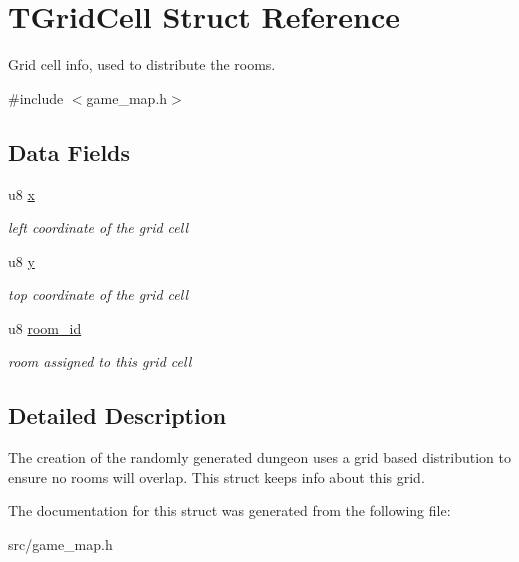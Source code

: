 \hypertarget{structTGridCell}{}\section{T\+Grid\+Cell Struct Reference}
\label{structTGridCell}


Grid cell info, used to distribute the rooms.  




{\ttfamily \#include $<$game\+\_\+map.\+h$>$}

\subsection*{Data Fields}
\begin{DoxyCompactItemize}
\item 
u8 \mbox{\hyperlink{group__GameMap_ga9eb413b36d66119ffbb32a5a23c5d628}{x}}
\begin{DoxyCompactList}\small\item\em left coordinate of the grid cell \end{DoxyCompactList}\item 
u8 \mbox{\hyperlink{group__GameMap_ga203679fb4506b253419a1eb4db418ae5}{y}}
\begin{DoxyCompactList}\small\item\em top coordinate of the grid cell \end{DoxyCompactList}\item 
u8 \mbox{\hyperlink{group__GameMap_gaf6810a8c1ba4361c7fda884f6cbb7787}{room\+\_\+id}}
\begin{DoxyCompactList}\small\item\em room assigned to this grid cell \end{DoxyCompactList}\end{DoxyCompactItemize}


\subsection{Detailed Description}
The creation of the randomly generated dungeon uses a grid based distribution to ensure no rooms will overlap. This struct keeps info about this grid. 

The documentation for this struct was generated from the following file\+:\begin{DoxyCompactItemize}
\item 
src/game\+\_\+map.\+h\end{DoxyCompactItemize}
